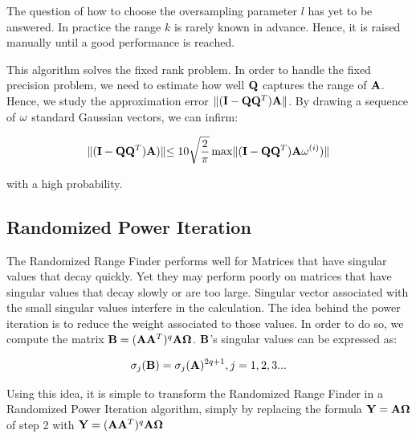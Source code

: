 \documentclass[onecolumn,12pt]{article}
\begin{document}
The question of how to choose the oversampling parameter $l$ has yet to be
answered. In practice the range $k$ is rarely known in advance. Hence, it is
raised manually until a good performance is reached.

This algorithm solves the fixed rank problem. In order to handle the fixed
precision problem, we need to estimate how well $\bold{Q}$ captures the range
of $\bold{A}$. Hence, we study the approximation error 
$\lVert (\bold{I} - \bold{Q} \bold{Q}^T) \bold{A} \lVert$. By drawing a
sequence of $\bold{\omega}$ standard Gaussian vectors, we can infirm:

\begin{equation}
\label{rrf-error}
\lVert (\bold{I} - \bold{Q}\bold{Q}^T) \bold{A})  \lVert \leq 10
\sqrt{\frac{2}{\pi}}
\max \lVert(\bold{I} - \bold{Q}\bold{Q}^T) \bold{A} \bold{\omega}^{(i)})  \lVert
\end{equation}

with a high probability.

\subsection{Randomized Power Iteration}

The Randomized Range Finder performs well for Matrices that have singular
values that decay quickly. Yet they may perform poorly on matrices that have
singular values that decay slowly or are too large. Singular vector associated
with the small singular values interfere in the calculation. The idea behind
the power iteration is to reduce the weight associated to those values. In
order to do so, we compute the matrix 
$\bold{B} = (\bold{A}\bold{A}^T)^q\bold{A} \bold{\Omega}$. $\bold{B}$'s singular
values can be expressed as:

\begin{equation}
\label{rps-svd}
\sigma_j(\bold{B}) = \sigma_j(\bold{A})^{2q+1}, j=1, 2, 3...
\end{equation}

Using this idea, it is simple to transform the Randomized Range Finder in a
Randomized Power Iteration algorithm, simply by replacing the formula
$\bold{Y} = \bold{A} \bold{\Omega}$ of step 2 with
$\bold{Y} = (\bold{A}\bold{A}^T)^q\bold{A}  \bold{\Omega}$

\noindent{}
\end{document}
